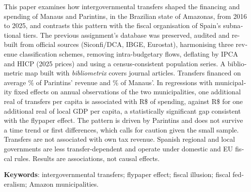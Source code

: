 \documentclass[article,11pt,oneside,a4paper,english,brazil,sumario=tradicional]{abntex2}
\begin{document}
\begin{otherlanguage}{english}
\begin{resumoumacoluna}
This paper examines how intergovernmental transfers shaped the financing and spending of Manaus and Parintins, in the Brazilian state of Amazonas, from 2016 to 2025, and contrasts this pattern with the fiscal organisation of Spain's subnational tiers. The previous assignment's database was preserved, audited and rebuilt from official sources (Siconfi/DCA, IBGE, Eurostat), harmonising three revenue classification schemes, removing intra-budgetary flows, deflating by IPCA and HICP (2025 prices) and using a census-consistent population series. A bibliometric map built with \textit{bibliometrix} covers \bibDocs{} journal articles. Transfers financed on average \depParMedia\% of Parintins' revenue and \depManMedia\% of Manaus'. In regressions with municipality fixed effects on \nUm{} annual observations of the two municipalities, one additional real of transfers per capita is associated with R\$ \bTrUm{} of spending, against R\$ \bPibUm{} for one additional real of local GDP per capita, a statistically significant gap consistent with the flypaper effect. The pattern is driven by Parintins and does not survive a time trend or first differences, which calls for caution given the small sample. Transfers are not associated with own tax revenue. Spanish regional and local governments are less transfer-dependent and operate under domestic and EU fiscal rules. Results are associations, not causal effects.

\vspace{\onelineskip}
\noindent\textbf{Keywords}: intergovernmental transfers; flypaper effect; fiscal illusion; fiscal federalism; Amazon municipalities.
\end{resumoumacoluna}
\end{otherlanguage}









\appendix

\end{document}
